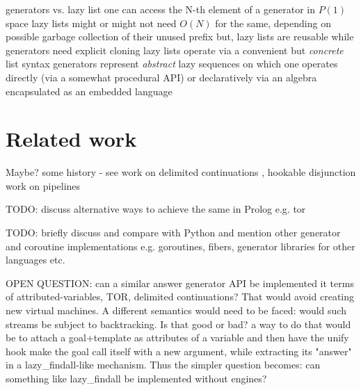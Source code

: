 \documentclass{new_tlp}
\begin{document}
\BI
{\Large
\I generators vs. lazy list
\BI
\I one  can access the N-th element of a  generator in $P(1)$ space
\I lazy lists might or might not need $O(N)$ for the same, depending on possible garbage collection of their unused prefix
\I but, lazy lists are reusable while generators need explicit cloning
\I lazy lists operate via a convenient but {\em concrete} list syntax
\I generators represent {\em abstract} lazy sequences on which one operates directly (via a somewhat procedural API) or declaratively via an algebra encapsulated as an embedded language
\EI
}


\EI



\section{Related work}

\vskip 1cm
Maybe?
\BI 
\I some history - see
\cite{tarau:parimp99,tarau:cl2000,iclp08:inter,ciclops08:pINTER}
\cite{coord11tarau}
\cite{bp2011}
\I work on delimited continuations \cite{delim}, hookable disjunction \cite{tor}
\I work on pipelines \cite{pipelines}
\EI


{\Large TODO: discuss alternative ways to achieve the same in Prolog e.g. tor \cite{tor}}

{\Large TODO: briefly discuss and compare with Python and mention other generator and coroutine implementations e.g. goroutines, fibers, generator libraries for other languages etc.}

{\Large OPEN QUESTION: can a similar answer generator API be implemented
it terms of  attributed-variables, TOR, delimited continuations? That 
would avoid creating new virtual machines. A different semantics would need to
be faced: would such streams be subject to backtracking. Is that good or bad? 
} a way to do that would be to attach a goal+template as attributes of a variable
and then have the unify hook make the goal call itself with a new argument, while
extracting its "answer" in a lazy\_findall-like mechanism. Thus the simpler question becomes:
{\large can something like lazy\_findall be implemented without engines?}
\end{document}
